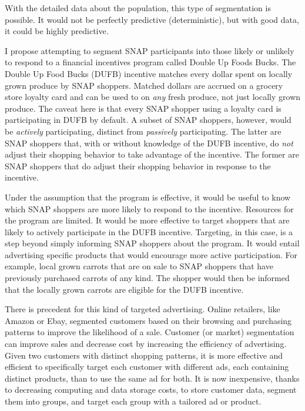 \documentclass[12pt,letterpaperpaper,]{book}
\begin{document}
With the detailed data about the population, this type of segmentation
is possible. It would not be perfectly predictive (deterministic), but
with good data, it could be highly predictive.

I propose attempting to segment SNAP participants into those likely or
unlikely to respond to a financial incentives program called Double Up
Foods Bucks. The Double Up Food Bucks (DUFB) incentive matches every
dollar spent on locally grown produce by SNAP shoppers. Matched dollars
are accrued on a grocery store loyalty card and can be used to on
\emph{any} fresh produce, not just locally grown produce. The caveat
here is that every SNAP shopper using a loyalty card is participating in
DUFB by default. A subset of SNAP shoppers, however, would be
\emph{actively} participating, distinct from \emph{passively}
participating. The latter are SNAP shoppers that, with or without
knowledge of the DUFB incentive, do \emph{not} adjust their shopping
behavior to take advantage of the incentive. The former are SNAP
shoppers that do adjust their shopping behavior in response to the
incentive.

Under the assumption that the program is effective, it would be useful
to know which SNAP shoppers are more likely to respond to the incentive.
Resources for the program are limited. It would be more effective to
target shoppers that are likely to actively participate in the DUFB
incentive. Targeting, in this case, is a step beyond simply informing
SNAP shoppers about the program. It would entail advertising specific
products that would encourage more active participation. For example,
local grown carrots that are on sale to SNAP shoppers that have
previously purchased carrots of any kind. The shopper would then be
informed that the locally grown carrots are eligible for the DUFB
incentive.

There is precedent for this kind of targeted advertising. Online
retailers, like Amazon or Ebay, segmented customers based on their
browsing and purchasing patterns to improve the likelihood of a sale.
Customer (or market) segmentation can improve sales and decrease cost by
increasing the efficiency of advertising. Given two customers with
distinct shopping patterns, it is more effective and efficient to
specifically target each customer with different ads, each containing
distinct products, than to use the same ad for both. It is now
inexpensive, thanks to decreasing computing and data storage costs, to
store customer data, segment them into groups, and target each group
with a tailored ad or product.
\end{document}
